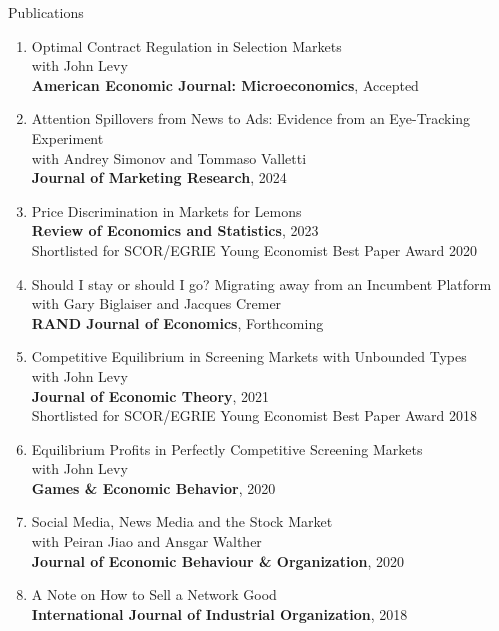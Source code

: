 \documentclass{resume}
\begin{document}
\begin{rSection}{Publications}

\begin{enumerate}

\item Optimal Contract Regulation in Selection Markets \\
with John Levy\\ \textbf{American Economic Journal: Microeconomics}, Accepted

\item Attention Spillovers from News to Ads: Evidence from an Eye-Tracking Experiment \\ with Andrey Simonov and Tommaso Valletti\\ \textbf{Journal of Marketing Research}, 2024

\item Price Discrimination in Markets for Lemons \\ 
\textbf{Review of Economics and Statistics}, 2023 \\
Shortlisted for SCOR/EGRIE Young Economist Best Paper Award 2020

\item Should I stay or should I go? Migrating away from an Incumbent Platform \\ 
with Gary Biglaiser and Jacques Cremer \\ 
\textbf{RAND Journal of Economics}, Forthcoming

\item Competitive Equilibrium in Screening Markets with Unbounded Types\\ 
with John Levy \\
\textbf{Journal of Economic Theory}, 2021
\\ Shortlisted for SCOR/EGRIE Young Economist Best Paper Award 2018

\item Equilibrium Profits in Perfectly Competitive Screening Markets\\
with John Levy \\
\textbf{Games \& Economic Behavior}, 2020

\item Social Media, News Media and the Stock Market\\ 
with Peiran Jiao and Ansgar Walther \\
\textbf{Journal of Economic Behaviour \& Organization}, 2020

\item A Note on How to Sell a Network Good \\
\textbf{International Journal of Industrial Organization}, 2018


\end{enumerate}
\end{rSection}
\end{document}

